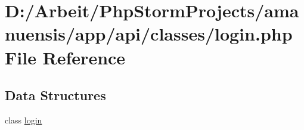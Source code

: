 \hypertarget{a00065}{}\section{D\+:/\+Arbeit/\+Php\+Storm\+Projects/amanuensis/app/api/classes/login.php File Reference}
\label{a00065}
\subsection*{Data Structures}
\begin{DoxyCompactItemize}
\item 
class \hyperlink{a00029}{login}
\end{DoxyCompactItemize}
